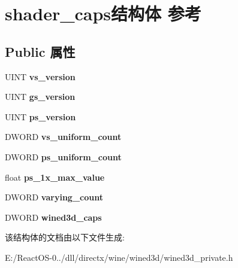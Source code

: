 \hypertarget{structshader__caps}{}\section{shader\+\_\+caps结构体 参考}
\label{structshader__caps}
\subsection*{Public 属性}
\begin{DoxyCompactItemize}
\item 
\mbox{\label{structshader__caps_ad5412ce45d4569c68c45756e325d6a21}} 
U\+I\+NT {\bfseries vs\+\_\+version}
\item 
\mbox{\label{structshader__caps_abf49989c1bccb14b7e05aa87170bc5ae}} 
U\+I\+NT {\bfseries gs\+\_\+version}
\item 
\mbox{\label{structshader__caps_a03ba3a086527c79d3316a5d4a10149aa}} 
U\+I\+NT {\bfseries ps\+\_\+version}
\item 
\mbox{\label{structshader__caps_a72bf78309719f48395e92c29f2c6a7ac}} 
D\+W\+O\+RD {\bfseries vs\+\_\+uniform\+\_\+count}
\item 
\mbox{\label{structshader__caps_a7c0063b6a4b878d8e9265272c2d77784}} 
D\+W\+O\+RD {\bfseries ps\+\_\+uniform\+\_\+count}
\item 
\mbox{\label{structshader__caps_aa0a73eb366f94b7230d97a6e8b93e105}} 
float {\bfseries ps\+\_\+1x\+\_\+max\+\_\+value}
\item 
\mbox{\label{structshader__caps_a8ed25f3ef0b2fc54e8a3b6adc6f5d59c}} 
D\+W\+O\+RD {\bfseries varying\+\_\+count}
\item 
\mbox{\label{structshader__caps_a12810ce4e77ba3da5fb7bf3bf60d41e0}} 
D\+W\+O\+RD {\bfseries wined3d\+\_\+caps}
\end{DoxyCompactItemize}


该结构体的文档由以下文件生成\+:\begin{DoxyCompactItemize}
\item 
E\+:/\+React\+O\+S-\/0../dll/directx/wine/wined3d/wined3d\+\_\+private.\+h\end{DoxyCompactItemize}
